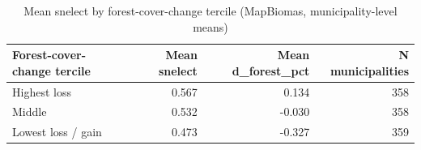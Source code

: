 \begin{table}

\caption{Mean snelect by forest-cover-change tercile (MapBiomas, municipality-level means)}
\centering
\begin{tabular}[t]{lrrr}
\toprule
Forest-cover-change tercile & Mean snelect & Mean d\_forest\_pct & N municipalities\\
\midrule
Highest loss & 0.567 & 0.134 & 358\\
Middle & 0.532 & -0.030 & 358\\
Lowest loss / gain & 0.473 & -0.327 & 359\\
\bottomrule
\end{tabular}
\end{table}
